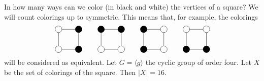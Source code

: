 \begin{example}
    In how many ways can we color (in black and white) the vertices of a square? 
    We will count colorings up to symmetric. This means that, for example, 
    the colorings 
    \begin{equation}
    \label{eq:orbita}
    \begin{tikzpicture}
        \node[shape=circle,draw=black,fill=black] (A) at (1,0){};
        \node[shape=circle,draw=black,fill=black] (B) at (1,1){};
        \node[shape=circle,draw=black] (C) at (0,1){}; 
        \node[shape=circle,draw=black] (D) at (0,0){};
        \path [-](A) edge node[left]{} (B);
        \path [-](B) edge node[left]{} (C);
        \path [-](C) edge node[left]{} (D);
        \path [-](D) edge node[left]{} (A);
    \end{tikzpicture}
    \qquad
    \begin{tikzpicture}
        \node[shape=circle,draw=black] (A) at (1,0) {};
        \node[shape=circle,draw=black,fill=black] (B) at (1,1) {};
        \node[shape=circle,draw=black,fill=black] (C) at (0,1) {};
        \node[shape=circle,draw=black] (D) at (0,0) {};
        \path [-](A) edge node[left]{} (B);
        \path [-](B) edge node[left]{} (C);
        \path [-](C) edge node[left]{} (D);
        \path [-](D) edge node[left]{} (A);
    \end{tikzpicture}
    \qquad
    \begin{tikzpicture}
        \node[shape=circle,draw=black] (A) at (1,0) {};
        \node[shape=circle,draw=black] (B) at (1,1) {};
        \node[shape=circle,draw=black,fill=black] (C) at (0,1) {};
        \node[shape=circle,draw=black,fill=black] (D) at (0,0) {};
        \path [-](A) edge node[left]{} (B);
        \path [-](B) edge node[left]{} (C);
        \path [-](C) edge node[left]{} (D);
        \path [-](D) edge node[left]{} (A);
    \end{tikzpicture}
    \qquad
    \begin{tikzpicture}
        \node[shape=circle,draw=black,fill=black] (A) at (1,0) {};
        \node[shape=circle,draw=black] (B) at (1,1) {};
        \node[shape=circle,draw=black] (C) at (0,1) {};
        \node[shape=circle,draw=black,fill=black] (D) at (0,0) {};
        \path [-](A) edge node[left]{} (B);
        \path [-](B) edge node[left]{} (C);
        \path [-](C) edge node[left]{} (D);
        \path [-](D) edge node[left]{} (A);
    \end{tikzpicture}
\end{equation}
will be considered as equivalent. Let $G=\langle g\rangle$ the cyclic 
group of order four. Let $X$ be 
the set of colorings of the square. Then 
$|X|=16$. 


\end{example}
